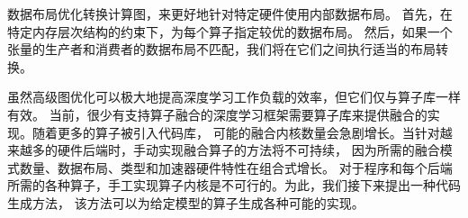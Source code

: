 数据布局优化转换计算图，来更好地针对特定硬件使用内部数据布局。
首先，在特定内存层次结构的约束下，为每个算子指定较优的数据布局。
然后，如果一个张量的生产者和消费者的数据布局不匹配，我们将在它们之间执行适当的布局转换。

虽然高级图优化可以极大地提高深度学习工作负载的效率，但它们仅与算子库一样有效。
当前，很少有支持算子融合的深度学习框架需要算子库来提供融合的实现。随着更多的算子被引入代码库，
可能的融合内核数量会急剧增长。当针对越来越多的硬件后端时，手动实现融合算子的方法将不可持续，
因为所需的融合模式数量、数据布局、类型和加速器硬件特性在组合式增长。
对于程序和每个后端所需的各种算子，手工实现算子内核是不可行的。为此，我们接下来提出一种代码生成方法，
该方法可以为给定模型的算子生成各种可能的实现。
